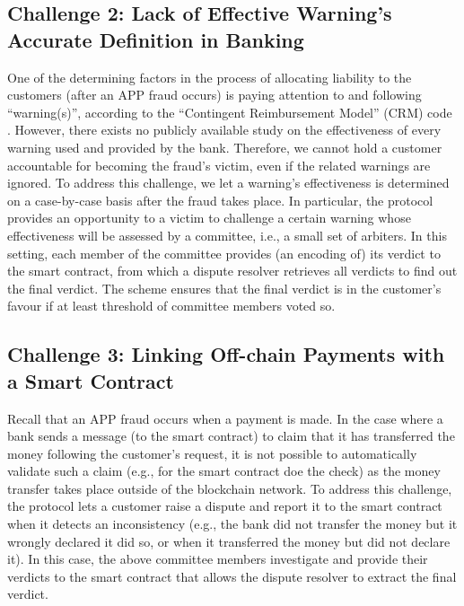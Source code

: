 \subsection{Challenge 2: Lack of Effective Warning's Accurate Definition in Banking}

One of the determining  factors in the process of allocating liability to the customers (after an APP fraud occurs) is paying attention to and following ``warning(s)'', according to the ``Contingent Reimbursement Model'' (CRM) code \cite{CRM-code}. However, there exists  no  publicly available study  on the  effectiveness of every warning used and provided by the bank. Therefore, we cannot hold a customer accountable for becoming the fraud's victim,  even if the related warnings are ignored.    To address this challenge, we let a warning's effectiveness is determined on a case-by-case basis after the fraud takes place. In particular, the protocol provides an opportunity to a victim to  challenge a certain warning whose effectiveness will be assessed by a committee, i.e., a small set of arbiters. In this setting, each member of the  committee provides (an encoding of) its verdict to the smart contract, from which a dispute resolver retrieves all verdicts to find out the final verdict. The scheme ensures that the final verdict is  in the customer's favour if at least threshold of committee members voted so. 







\subsection{Challenge 3: Linking Off-chain Payments with a Smart Contract}\label{sec::Linking Off-chain-Payments-with-contract}
 Recall that an APP fraud occurs when a payment is made. In the case where a  bank  sends a message (to the smart contract) to  claim  that it has transferred the money following the customer's request, it is not possible to automatically validate such a claim (e.g.,  for the smart contract doe the  check) as the money  transfer takes place  outside of the blockchain network. To address this challenge, the protocol lets a customer raise a dispute and report it to the smart contract when it detects an inconsistency (e.g., the bank did not transfer the money but it wrongly declared it did so, or when it transferred the money but did not declare it). In this case, the above committee members investigate and provide their  verdicts to the smart contract that allows the dispute resolver to extract the final verdict. 


